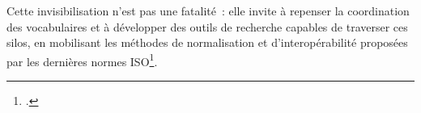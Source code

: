 Cette invisibilisation n’est pas une fatalité : elle invite à repenser la coordination des vocabulaires et à développer des outils de recherche capables de traverser ces silos, en mobilisant les méthodes de normalisation et d’interopérabilité proposées par les dernières normes ISO\footcite{chichereauNormesConceptionGestion2007, hudonISO25964Pour2012a}.